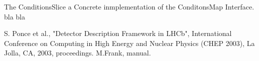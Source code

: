 \documentclass[10pt,a4paper]{article}
\begin{document}
\noindent
The ConditionsSlice a Concrete inmplementation of the ConditonsMap Interface.
bla bla

\newpage
\begin{thebibliography}{9}
 S. Ponce et al., 
                "Detector Description Framework in LHCb", 
                International Conference on Computing in High Energy and Nuclear Physics  (CHEP 2003), 
                La Jolla, CA, 2003, proceedings. 
  M.Frank, \DDA manual.
\end{thebibliography}
\end{document}
